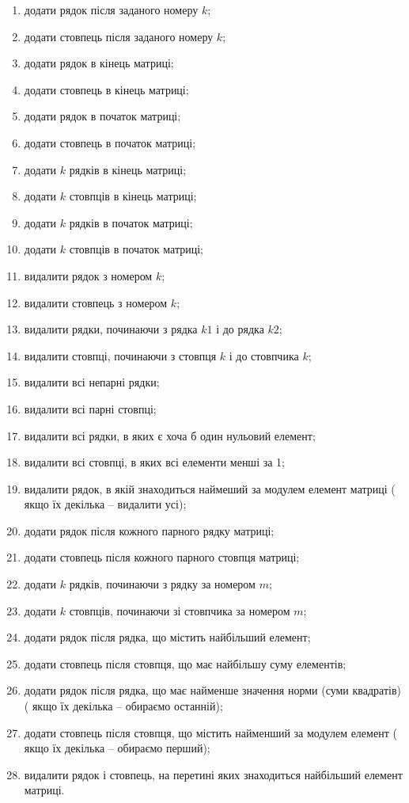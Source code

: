 \documentclass[a5paper,titlepage,openany,twoside,draft]{book_unv}%
\makeatletter
\newcommand{\xslalph}[1]{\expandafter\@xslalph\csname c@#1\endcsname}
\newcommand{\@xslalph}[1]{%
    \ifcase#1\or а\or б\or в\or г\or д\or e\or є\or ж\or з\or i%
    \or й\or к\or л\or м\or н\or о\or п\or р\or с\or т%
    \or у\or ф\or х\or ц\or ч\or ш\or ю\or я\or аа\or бб\or вв%
    \else\@ctrerr\fi%
}
\makeatother
\begin{document}
\begin{enumerate}
\begin{enumerate}[label=\xslalph*)]
\item
  додати рядок після заданого номеру $k$;
\item
  додати стовпець після заданого номеру $k$;
\item
  додати рядок в кінець матриці;
\item
  додати стовпець в кінець матриці;
\item
  додати рядок в початок матриці;
\item
  додати стовпець в початок матриці;
\item
  додати $k$ рядків в кінець матриці;
\item
  додати $k$ стовпців в кінець матриці;
\item
  додати $k$ рядків в початок матриці;
\item
  додати $k$ стовпців в початок матриці;
\item
  видалити рядок з номером $k$;
\item
  видалити стовпець з номером $k$;
\item
  видалити рядки, починаючи з рядка $k1$ і до рядка $k2$;
\item
  видалити стовпці, починаючи з стовпця $k$ і до стовпчика $k$;
\item
  видалити всі непарні рядки;
\item
  видалити всі парні стовпці;
\item
  видалити всі рядки, в яких є хоча б один нульовий елемент;
\item
  видалити всі стовпці, в яких всі елементи менші за 1;
\item
  видалити рядок, в якій знаходиться наймеший за модулем елемент матриці (
якщо їх декілька -- видалити усі);
\item
  додати рядок після кожного парного рядку матриці;
\item
  додати стовпець після кожного парного стовпця матриці;
\item
  додати $k$ рядків, починаючи з рядку за номером $m$;
\item
  додати $k$ стовпців, починаючи зі стовпчика за номером $m$;
\item
  додати рядок після рядка, що містить найбільший елемент;
\item
  додати стовпець після стовпця, що має найбільшу суму елементів;
\item
  додати рядок після рядка, що має найменше значення норми (суми квадратів)(
якщо їх декілька -- обираємо останній);
\item
  додати стовпець після стовпця, що містить найменший за модулем елемент (
якщо їх декілька -- обираємо перший);
\item
  видалити рядок і стовпець, на перетині яких знаходиться найбільший
  елемент матриці.
\end{enumerate}

\end{enumerate}
\end{document}
